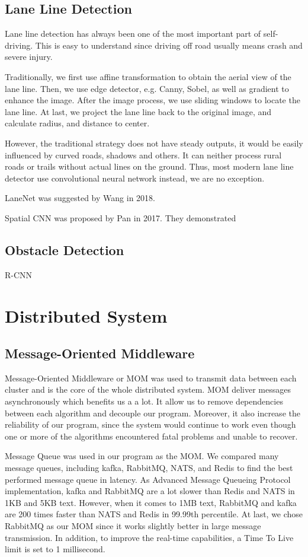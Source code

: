 \documentclass[runningheads]{llncs}
\begin{document}
\subsection{Lane Line Detection}
Lane line detection has always been one of the most 
important part of self-driving. This is easy to understand 
since driving off road usually means crash and severe 
injury. 

Traditionally, we first use affine transformation to obtain 
the aerial view of the lane line. Then, we use edge 
detector, e.g. Canny, Sobel, as well as gradient to enhance 
the image. After the image process, we use sliding windows 
to locate the lane line. At last, we project the lane line 
back to the original image, and calculate radius, and 
distance to center. 

However, the traditional strategy does not have steady 
outputs, it would be easily influenced by curved roads, 
shadows and others. It can neither process rural roads or 
trails without actual lines on the ground. Thus, most 
modern lane line detector use convolutional neural network 
instead, we are no exception. 

LaneNet was suggested by Wang\cite{LaneNet} in 2018. 

Spatial CNN was proposed by Pan\cite{SpatialCNN} in 2017. They 
demonstrated

\subsection{Obstacle Detection}
R-CNN 


\section{Distributed System}

\subsection{Message-Oriented Middleware}
Message-Oriented Middleware or MOM was used to transmit 
data between each cluster and is the core of the whole 
distributed system. MOM deliver messages asynchronously 
which benefits us a a lot. It allow us to remove 
dependencies between each algorithm and decouple our 
program. Moreover, it also increase the reliability of our 
program, since the system would continue to work even 
though one or more of the algorithms encountered fatal 
problems and unable to recover.

Message Queue was used in our program as the MOM. We 
compared many message queues, including kafka, RabbitMQ, 
NATS, and Redis to find the best performed message queue 
in latency. As Advanced Message Queueing Protocol 
implementation, kafka and RabbitMQ are a lot slower than 
Redis and NATS in 1KB and 5KB text. However, when it comes
to 1MB text, RabbitMQ and kafka are 200 times faster than 
NATS and Redis in 99.99th percentile. At last, we chose 
RabbitMQ as our MOM since it works slightly better in large 
message transmission. In addition, to improve the real-time 
capabilities, a Time To Live limit is set to 1 millisecond.
\end{document}
